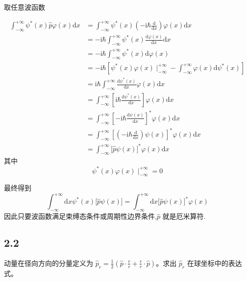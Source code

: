 取任意波函数

\begin{equation}
    \begin{aligned}
        \int_{-\infty}^{+\infty}{\psi ^*(x)\hat{p}\varphi (x)\mathrm{d}x}&=\int_{-\infty}^{+\infty}{\psi ^*(x)\left( -\mathrm{i}\hbar \frac{\mathrm{d}}{\mathrm{d}x} \right) \varphi (x)\mathrm{d}x}
\\
&=-\mathrm{i}\hbar \int_{-\infty}^{+\infty}{\psi ^*(x)\frac{\mathrm{d}\varphi (x)}{\mathrm{d}x}\mathrm{d}x}
\\
&=-\mathrm{i}\hbar \int_{-\infty}^{+\infty}{\psi ^*(x)\mathrm{d}\varphi (x)}
\\
&=-\mathrm{i}\hbar \left[ \psi ^*(x)\varphi (x)\mid_{-\infty}^{+\infty}-\int_{-\infty}^{+\infty}{\varphi (x)\mathrm{d}\psi ^*(x)} \right] 
\\
&=\mathrm{i}\hbar \int_{-\infty}^{+\infty}{\frac{\mathrm{d}\psi ^*(x)}{\mathrm{d}x}\varphi (x)\mathrm{d}x}
\\
&=\int_{-\infty}^{+\infty}{\left[ \mathrm{i}\hbar \frac{\mathrm{d}\psi ^*(x)}{\mathrm{d}x} \right] \varphi (x)\mathrm{d}x}
\\
&=\int_{-\infty}^{+\infty}{\left[ -\mathrm{i}\hbar \frac{\mathrm{d}\psi (x)}{\mathrm{d}x} \right] ^*\varphi (x)\mathrm{d}x}
\\
&=\int_{-\infty}^{+\infty}{\left[ \left( -\mathrm{i}\hbar \frac{\mathrm{d}}{\mathrm{d}x} \right) \psi (x) \right] ^*\varphi (x)\mathrm{d}x}
\\
&=\int_{-\infty}^{+\infty}{\bigl[ \hat{p}\psi (x) \bigr] ^*\varphi (x)\mathrm{d}x}
    \end{aligned}
\end{equation}
其中
\begin{equation}
    \psi ^*(x)\varphi (x)\mid_{-\infty}^{+\infty}=0
\end{equation}

最终得到
\begin{equation}
    \int_{-\infty}^{+\infty}{\mathrm{d}x}\psi ^*(x)\bigl[ \hat{p}\psi (x) \bigr] =\int_{-\infty}^{+\infty}{\mathrm{d}x}\bigl[ \hat{p}\psi (x) \bigr] ^*\varphi (x)
\end{equation}
因此只要波函数满足束缚态条件或周期性边界条件,$\hat{p}$ 就是厄米算符.

\subsection{2.2}
动量在径向方向的分量定义为 $\hat{p}_r = \frac{1}{2} \left( \hat{p} \cdot \frac{r}{r} + \frac{r}{r} \cdot \hat{p} \right)$。求出 $\hat{p}_r$ 在球坐标中的表达式。



